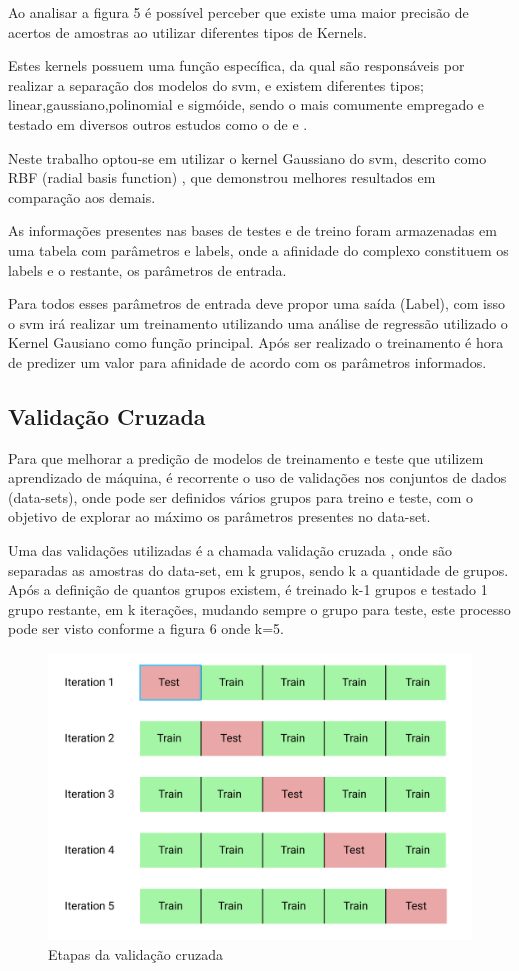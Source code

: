 \documentclass[tcc, capa]{texucpel}
\begin{document}
Ao analisar a figura 5 é possível perceber que existe uma maior precisão de acertos de amostras ao utilizar diferentes tipos de Kernels.

Estes kernels possuem uma função específica, da qual são responsáveis por realizar a separação dos modelos do svm, e existem diferentes tipos; linear,gaussiano,polinomial e sigmóide, sendo o mais comumente empregado e testado em diversos outros estudos como o de \cite{huang2005extreme} e \cite{lima2014avaliaccao}.

Neste trabalho optou-se em utilizar o kernel Gaussiano do svm, descrito como RBF (radial basis function) , que demonstrou melhores resultados em comparação aos demais.

As informações presentes nas bases de testes e de treino foram armazenadas em uma tabela com parâmetros e labels, onde a afinidade do complexo constituem os labels e o restante, os parâmetros de entrada. 

Para todos esses parâmetros de entrada deve propor uma saída (Label),  com isso o svm irá realizar um treinamento utilizando uma análise de regressão utilizado o Kernel Gausiano como função principal.
Após ser realizado o treinamento é hora de predizer um valor para afinidade de acordo com os parâmetros informados.

\subsection{Validação Cruzada}

Para que melhorar a predição de modelos de treinamento e teste que utilizem aprendizado de máquina, é recorrente o uso de validações nos conjuntos de dados (data-sets), onde pode ser definidos vários grupos para treino e teste, com o objetivo de explorar ao máximo os parâmetros presentes no data-set.

Uma das validações utilizadas é a chamada validação cruzada \cite{kohavi1995study}, onde são separadas as amostras do data-set, em k grupos, sendo k a quantidade de grupos. Após a definição de quantos grupos existem, é treinado k-1 grupos e testado 1 grupo restante, em k iterações, mudando sempre o grupo para teste, este processo pode ser visto conforme a figura 6 onde k=5.

    \begin{figure}[h]
	\centering
    \includegraphics[width=0.90\linewidth]{imagens/cv.png}
	\caption{Etapas da validação cruzada}
	\end{figure}
    \FloatBarrier
\end{document}
